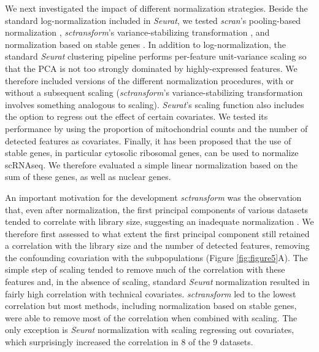 \documentclass{bmcart}
\begin{document}
We next investigated the impact of different normalization strategies. Beside the standard log-normalization included in \textit{Seurat}, we tested \textit{scran}'s pooling-based normalization \citep{lunPooling2016}, \textit{sctransform}'s variance-stabilizing transformation \citep{hafemeisterSCtransform2019}, and normalization based on stable genes \citep{linStableGenes2018, deekeStablyExpressed2018}. 
In addition to log-normalization, the standard \textit{Seurat} clustering pipeline performs per-feature unit-variance scaling so that the PCA is not too strongly dominated by highly-expressed features. We therefore included versions of the different normalization procedures, with or without a subsequent scaling (\textit{sctransform}'s variance-stabilizing transformation involves something analogous to scaling). 
\textit{Seurat}'s scaling function also includes the option to regress out the effect of certain covariates. We tested its performance by using the proportion of mitochondrial counts and the number of detected features as covariates. Finally, it has been proposed that the use of stable genes, in particular cytosolic ribosomal genes, can be used to normalize scRNAseq\citep{deekeStablyExpressed2018}. We therefore evaluated a simple linear normalization based on the sum of these genes, as well as nuclear genes.

An important motivation for the development \textit{sctransform} was the observation that, even after normalization, the first principal components of various datasets tended to correlate with library size, suggesting an inadequate normalization \citep{hafemeisterSCtransform2019}. We therefore first assessed to what extent the first principal component still retained a correlation with the library size and the number of detected features, removing the confounding covariation with the subpopulations (Figure \ref{fig:figure5}A). The simple step of scaling tended to remove much of the correlation with these features and, in the absence of scaling, standard \textit{Seurat} normalization resulted in fairly high correlation with technical covariates. \textit{sctransform} led to the lowest correlation but most methods, including normalization based on stable genes, were able to remove most of the correlation when combined with scaling. The only exception is \textit{Seurat} normalization with scaling regressing out covariates, which surprisingly increased the correlation in 8 of the 9 datasets.
\end{document}

